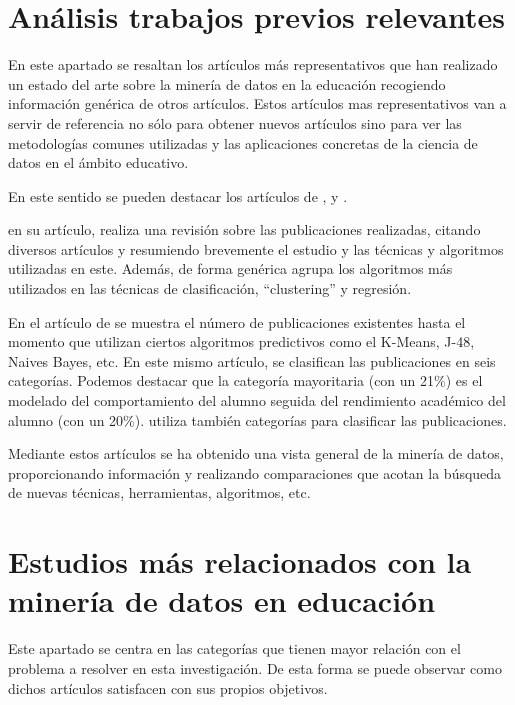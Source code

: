 \section{Análisis trabajos previos relevantes}
En este apartado se resaltan los artículos más representativos que han realizado un estado del arte sobre la minería de datos en la educación recogiendo información genérica de otros artículos.  Estos artículos mas representativos van a servir de referencia no sólo para obtener nuevos artículos sino para ver las metodologías comunes utilizadas y las aplicaciones concretas de la ciencia de datos en el ámbito educativo.

En este sentido se pueden destacar los artículos de ,  y .

 en su artículo, realiza una revisión sobre las publicaciones realizadas, citando diversos artículos y resumiendo brevemente el estudio y las técnicas y algoritmos utilizadas en este. Además, de forma genérica agrupa los algoritmos más utilizados en las técnicas de clasificación, ``clustering'' y regresión.

En el artículo de  se muestra el número de publicaciones existentes hasta el momento que utilizan ciertos algoritmos predictivos como el K-Means, J-48, Naives Bayes, etc. En este mismo artículo, se clasifican las publicaciones en seis categorías. Podemos destacar que la categoría mayoritaria (con un 21\%) es el modelado del comportamiento del alumno seguida del rendimiento académico del alumno (con un 20\%).  utiliza también categorías para clasificar las publicaciones.

Mediante estos artículos se ha obtenido una vista general de la minería de datos, proporcionando información y realizando comparaciones que acotan la búsqueda de nuevas técnicas, herramientas, algoritmos, etc.


\section{Estudios más relacionados con la minería de datos en educación}
Este apartado se centra en las categorías que tienen mayor relación con el problema a resolver en esta investigación. De esta forma se puede observar como dichos artículos satisfacen con sus propios objetivos.

